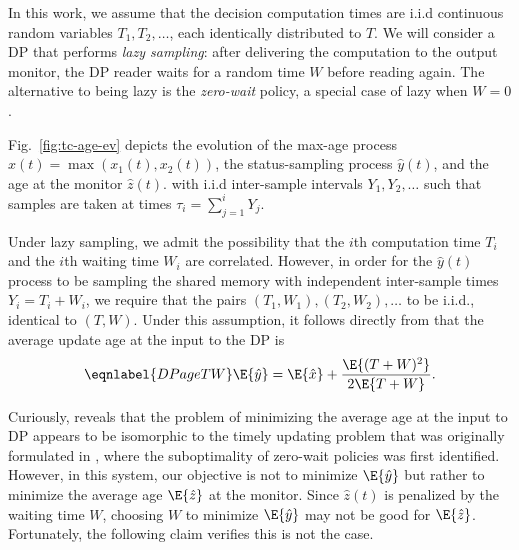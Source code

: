 \documentclass[conference, 10pt]{IEEEtran}
\newcommand{\oneage}{x_1}
\newcommand{\twoage}{x_2}
\newcommand{\maxage}{\hat{x}}
\newcommand{\dpage}{\hat{y}}
\newcommand{\monage}{\hat{z}}
\begin{document}
In this work, we assume that the decision computation times are i.i.d continuous random variables $T_1, T_2, \ldots$, each identically distributed to $T$. We will consider a DP that performs {\em lazy sampling}: after delivering the computation to the output monitor, the DP reader waits for a random time $W$ before reading again. The alternative
    to being lazy is the {\em zero-wait} policy, a special case of lazy when $W=0$.

Fig.~\ref{fig:tc-age-ev} depicts the evolution of the max-age process $\maxage(t)=\max(\oneage(t), \twoage(t))$, the status-sampling process $\dpage(t)$, and the age at the monitor $\monage(t)$.  with i.i.d inter-sample intervals $Y_1, Y_2, \ldots$ such that samples are taken at times $\tau_i = \sum_{j=1}^i Y_j$. 

Under lazy sampling, we admit the possibility that the $i$th computation time $T_i$ and the $i$th waiting time $W_i$ are correlated. However, in order for the $\dpage(t)$ process to be sampling the shared memory with independent inter-sample times $Y_i=T_i+W_i$, we require that the pairs $(T_1,W_1),(T_2,W_2),\ldots$ to be i.i.d., identical to $(T,W)$. Under this assumption, it follows directly from  that the average update age at the input to the DP is
\begin{equation}\eqnlabel{DPageTW}
\E{\dpage} = \E{\maxage}+\frac{\E{(T+W)^2}}{2\E{T+W}}.
\end{equation}

Curiously,  reveals that the problem of minimizing the average age at the input to DP appears to be isomorphic to the timely updating problem that was originally formulated in \cite{Sun-UBYKS-IT2017UpdateorWait,Yates-isit2015}, where the suboptimality of zero-wait policies was first identified. However, in this system, our objective is not to minimize $\E{\dpage}$ but rather to minimize the average age $\E{\monage}$ at the monitor.  Since $\monage(t)$ is penalized by the waiting time $W$, choosing $W$ to minimize $\E{\dpage}$ may not be good for $\E{\monage}$.
Fortunately, the following claim verifies this is not the case. 
\end{document}
